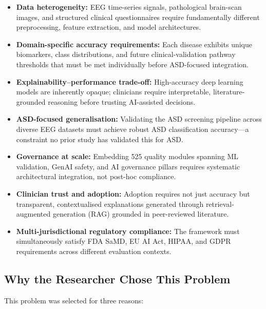\begin{itemize}[leftmargin=*, itemsep=3pt]
    \item \textbf{Data heterogeneity:} EEG time-series signals, pathological brain-scan images, and structured clinical questionnaires require fundamentally different preprocessing, feature extraction, and model architectures.
    \item \textbf{Domain-specific accuracy requirements:} Each disease exhibits unique biomarkers, class distributions, and future clinical-validation pathway thresholds that must be met individually before ASD-focused integration.
    \item \textbf{Explainability--performance trade-off:} High-accuracy deep learning models are inherently opaque; clinicians require interpretable, literature-grounded reasoning before trusting AI-assisted decisions.
    \item \textbf{ASD-focused generalisation:} Validating the ASD screening pipeline across diverse EEG datasets must achieve robust ASD classification accuracy---a constraint no prior study has validated this for ASD.
    \item \textbf{Governance at scale:} Embedding 525 quality modules spanning ML validation, GenAI safety, and AI governance pillars requires systematic architectural integration, not post-hoc compliance.
    \item \textbf{Clinician trust and adoption:} Adoption requires not just accuracy but transparent, contextualised explanations generated through retrieval-augmented generation (RAG) grounded in peer-reviewed literature.
    \item \textbf{Multi-jurisdictional regulatory compliance:} The framework must simultaneously satisfy FDA SaMD, EU AI Act, HIPAA, and GDPR requirements across different evaluation contexts.
\end{itemize}

\subsection{Why the Researcher Chose This Problem}
\label{sec:why_chose}

This problem was selected for three reasons:

